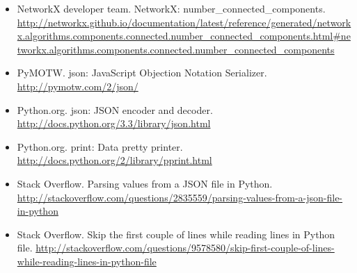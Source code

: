 \documentclass{article}
\begin{document}
\begin{itemize}
\item NetworkX developer team. NetworkX: number\_connected\_components. \url{http://networkx.github.io/documentation/latest/reference/generated/networkx.algorithms.components.connected.number_connected_components.html#networkx.algorithms.components.connected.number_connected_components}
\item PyMOTW. json: JavaScript Objection Notation Serializer. \url{http://pymotw.com/2/json/}
\item Python.org. json: JSON encoder and decoder. \url{http://docs.python.org/3.3/library/json.html}
\item Python.org. print: Data pretty printer. \url{http://docs.python.org/2/library/pprint.html}
\item Stack Overflow. Parsing values from a JSON file in Python. \url{http://stackoverflow.com/questions/2835559/parsing-values-from-a-json-file-in-python}
\item Stack Overflow. Skip the first couple of lines while reading lines in Python file. \url{http://stackoverflow.com/questions/9578580/skip-first-couple-of-lines-while-reading-lines-in-python-file}



\end{itemize}
\end{document}
